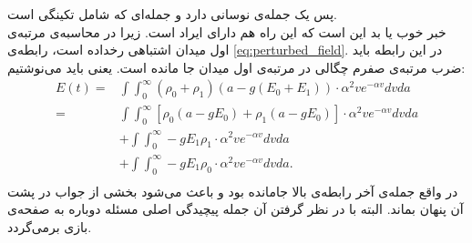 پس یک جمله‌ی نوسانی دارد و جمله‌ای که شامل تکینگی است.\\
خبر خوب یا بد این است که این راه هم دارای ایراد است. زیرا در محاسبه‌ی مرتبه‌ی اول میدان اشتباهی رخداده است، رابطه‌ی \ref{eq:perturbed_field}.
در این رابطه باید ضرب مرتبه‌ی صفرم چگالی در مرتبه‌ی اول میدان جا مانده است. یعنی باید می‌نوشتیم:
\begin{align}
		E(t) =& \int \int_{0}^{\infty} (\rho_0 + \rho_1)(a - g(E_0 + E_1) ) \cdot \alpha^2 ve^{-\alpha v} dv da \\
		=& \int \int_{0}^{\infty} [\rho_0(a - gE_0) + \rho_1 (a - gE_0)] \cdot \alpha^2 ve^{-\alpha v} dv da \\
		&+ \int \int_{0}^{\infty} -g E_1 \rho_1 \cdot \alpha^2 ve^{-\alpha v} dv da \\
		&+ \int \int_{0}^{\infty} -g E_1 \rho_0 \cdot \alpha^2 ve^{-\alpha v} dv da . \\
\end{align}
در واقع جمله‌ی آخر رابطه‌ی بالا جامانده بود و باعث می‌شود بخشی از جواب در پشت آن پنهان بماند. البته با در نظر گرفتن آن جمله پیچیدگی اصلی مسئله دوباره به صفحه‌ی بازی برمی‌گردد.
 
 
 
 
 
 
 
 


